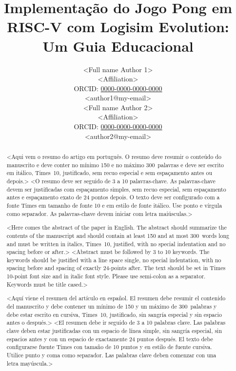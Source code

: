 \documentclass[english, spanish,brazilian]{RBIEarticle} %
\title{Implementação do Jogo Pong em RISC-V com Logisim Evolution: Um Guia Educacional}
\author{%
	\parbox{8cm}{%
		<Full name Author 1>\\
		<Affiliation>\\
		ORCID: \href{https://orcid.org/0000-0000-0000-0000}{0000-0000-0000-0000}\\
		<author1@my-email>
	}
	\parbox{8cm}{%
		<Full name Author 2>\\
		<Affiliation>\\
		ORCID: \href{https://orcid.org/0000-0000-0000-0000}{0000-0000-0000-0000}\\
		<author2@my-email>
	}
}
\begin{document}
\maketitle

\begin{otherlanguage}{brazilian}
\begin{abstract}
<Aqui vem o resumo do artigo em português. O resumo deve resumir o conteúdo do manuscrito e deve conter no mínimo 150 e no máximo 300~palavras e deve ser escrito em itálico, Times~10, justificado, sem recuo especial e sem espaçamento antes ou depois.>
\keywords <O resumo deve ser seguido de 3 a 10 palavras-chave. As palavras-chave devem ser justificadas com espaçamento simples, sem recuo especial, sem espaçamento antes e espaçamento exato de 24 pontos depois. O texto deve ser configurado com a fonte Times em tamanho de fonte 10 e em estilo de fonte itálico. Use ponto e vírgula como separador. As palavras-chave devem iniciar com letra maiúsculas.>
\end{abstract}
\end{otherlanguage}

\begin{otherlanguage}{english}
\begin{abstract}
<Here comes the abstract of the paper in English. The abstract should summarize the contents of the manuscript and should contain at least 150 and at most 300~words long and must be written in italics, Times~10, justified, with no special indentation and no spacing before or after.>
\keywords <Abstract must be followed by 3 to 10 keywords. The keywords should be justified with a line space single, no special indentation, with no spacing before and spacing of exactly 24-points after. The text should be set in Times 10-point font size and in italic font style. Please use semi-colon as a separator. Keywords must be title cased.>
\end{abstract}
\end{otherlanguage}

\begin{otherlanguage}{spanish}
\begin{abstract}
<Aquí viene el resumen del artículo en español. El resumen debe resumir el contenido del manuscrito y debe contener un mínimo de 150 y un máximo de 300~palabras y debe estar escrito en cursiva, Times~10, justificado, sin sangría especial y sin espacio antes o después.>
\keywords <El resumen debe ir seguido de 3 a 10 palabras clave. Las palabras clave deben estar justificadas con un espacio de línea simple, sin sangría especial, sin espacios antes y con un espacio de exactamente 24 puntos después. El texto debe configurarse fuente Times con tamaño de 10 puntos y en estilo de fuente cursiva. Utilice punto y coma como separador. Las palabras clave deben comenzar con una letra mayúscula.>
\end{abstract}
\end{otherlanguage}
\end{document}
